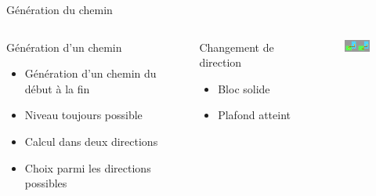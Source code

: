 \documentclass{beamer}
\begin{document}
{\begin{frame}{Génération du chemin}
    \begin{columns}
        \begin{block}{Génération d'un chemin}
            \begin{itemize}
                \item[\bullet] Génération d'un chemin du début à la fin
                \item[\bullet] Niveau toujours possible
                \item[\bullet] Calcul dans deux directions
                \item[\bullet] Choix parmi les directions possibles
            \end{itemize}
        \end{block}
        \begin{block}{Changement de direction}
            \begin{itemize}
                \item[\bullet] Bloc solide
                \item[\bullet] Plafond atteint
            \end{itemize}
        \end{block}
        \begin{figure}
            \centering
            \includegraphics[width=1.0\textwidth]{two_ways_to_connect}
        \end{figure}
    \end{columns}
\end{frame}

}
\end{document}
